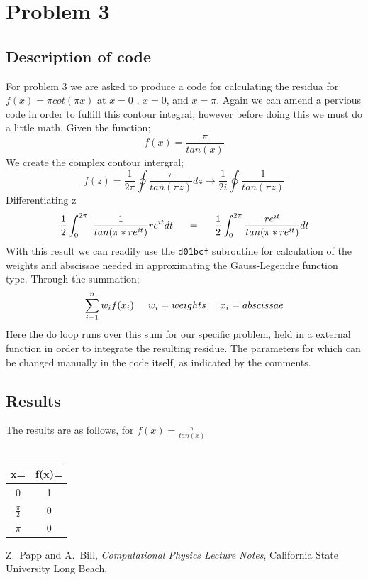 \documentclass[12pt,letterpaper,notitlepage]{article}
\begin{document}
\section{Problem 3}
\subsection{Description of code}
For problem 3 we are asked to produce a code for calculating the residua for $ f(x)= \pi cot (\pi x ) $ at $x=0$ , $x=0$, and $x=\pi$.
Again we can amend a pervious code in order to fulfill this contour integral, however before doing this we must do a little math.
Given the function;
	\begin{equation}
		f(x)= \frac{\pi}{tan(x)} 	
	\end{equation}
We create the complex contour intergral;
	\begin{equation}
		f(z)= \frac{1}{2\pi}\oint{\frac{\pi}{ tan(\pi z)}} dz \rightarrow   \frac{1}{2i} \oint \frac{1}{tan(\pi z)}
	\end{equation}
Differentiating z
	\begin{equation}
		\frac{1}{2} \int_0 ^{2\pi} \ \frac{1}{tan(\pi * re^{it})} re^{it} dt \hspace{.5cm} = \hspace{.5cm} \frac{1}{2} \int_0 ^{2 \pi} \frac{re^{it}}{tan(\pi * re^{it})} dt
	\end{equation}
With this result we can readily use the {\tt d01bcf} subroutine for calculation of the weights and abscissae needed in approximating  the Gauss-Legendre function type. Through the summation;
	\begin{equation}
		\sum_{i=1} ^{n}	w_i f(x_i)   \hspace{.5cm}  w_i = weights \hspace{.5cm} x_i = abscissae  
	\end{equation}
Here the do loop runs over this sum for our specific problem, held in a external function in order to integrate the resulting residue.  The parameters for which can be changed manually in the code itself, as indicated by the comments.   
\subsection{Results}
The results are as follows, for $f(x)= \frac{\pi}{tan(x)}$
\\\\
\begin{center}
\begin{tabular}{ |c|c| } 
 \hline
 x= 			& f(x)=   \\ 
 \hline
 0 			& 1   \\ 
  $\frac{\pi}{2}$	& 0   \\ 
  $\pi$ 		& 0   \\ 
 \hline
\end{tabular}
\end{center}




\begin{thebibliography}{}

	\bibitem{}
	Z.~Papp and A.~Bill, {\it Computational Physics Lecture Notes}, California State University Long Beach.
	
\end{thebibliography}
\end{document}

